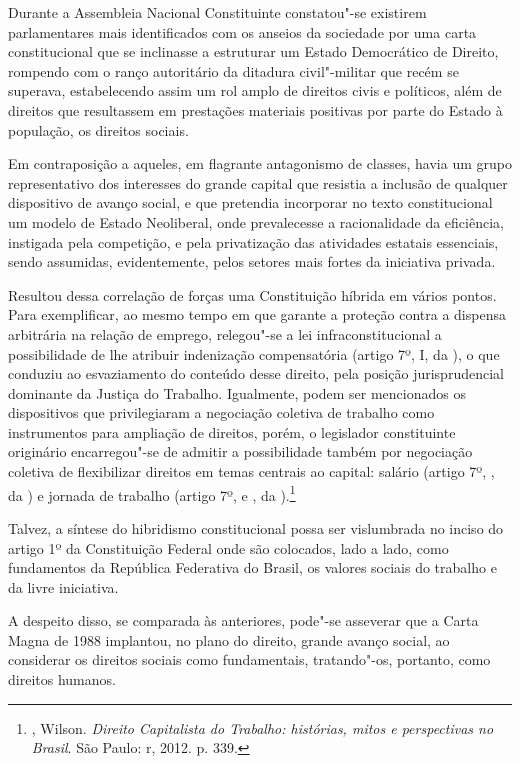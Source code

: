 Durante a Assembleia Nacional Constituinte consta\-tou"-se existirem
parlamentares mais identificados com os anseios da sociedade por uma
carta constitucional que se inclinasse a estruturar um Estado
Democrático de Direito, rompendo com o ranço autoritário da ditadura
civil"-militar que recém se superava, estabelecendo assim um rol amplo de
direitos civis e políticos, além de direitos que resultassem em
prestações materiais positivas por parte do Estado à população, os
direitos sociais.

Em contraposição a aqueles, em flagrante antagonismo de classes, havia
um grupo representativo dos interesses do grande capital que resistia a
inclusão de qualquer dispositivo de avanço social, e que pretendia
incorporar no texto constitucional um modelo de Estado Neoliberal, onde
prevalecesse a racionalidade da eficiência, instigada pela competição, e
pela privatização das atividades estatais essenciais, sendo assumidas,
evidentemente, pelos setores mais fortes da iniciativa privada.

Resultou dessa correlação de forças uma Constituição híbrida em vários
pontos. Para exemplificar, ao mesmo tempo em que garante a proteção
contra a dispensa arbitrária na relação de emprego, relegou"-se a lei
infraconstitucional a possibilidade de lhe atribuir indenização
compensatória (artigo 7º, I, da ), o que conduziu ao esvaziamento do
conteúdo desse direito, pela posição jurisprudencial dominante da
Justiça do Trabalho. Igualmente, podem ser mencionados os dispositivos
que privilegiaram a negociação coletiva de trabalho como instrumentos
para ampliação de direitos, porém, o legislador constituinte originário
encarregou"-se de admitir a possibilidade também por negociação coletiva
de flexibilizar direitos em temas centrais ao capital: salário (artigo
7º, , da ) e jornada de trabalho (artigo 7º,  e , da
).\footnote{ , Wilson. \emph{Direito Capitalista do
  Trabalho: histórias, mitos e perspectivas no Brasil}. São Paulo: r,
  2012. p. 339.}

Talvez, a síntese do hibridismo constitucional possa ser vislumbrada no
inciso  do artigo 1º da Constituição Federal onde são colocados, lado
a lado, como fundamentos da República Federativa do Brasil, os valores
sociais do trabalho e da livre iniciativa.

A despeito disso, se comparada às anteriores, pode"-se asseverar que a
Carta Magna de 1988 implantou, no plano do direito, grande avanço
social, ao considerar os direitos sociais como fundamentais,
tratando"-os, portanto, como direitos humanos.

